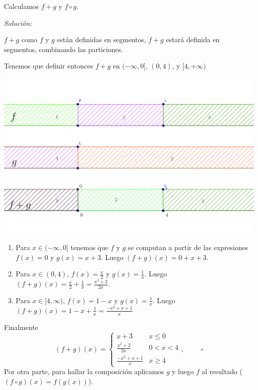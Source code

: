 \documentclass[10pt,a4paper]{article}
\renewcommand{\o}{\circ}
\begin{document}
Calculamos $f + g$ y $f \o g$.


\noindent
\emph{Solución:}

\noindent
$f + g$ como $f$ y $g$ están definidas en segmentos,
$f+g$ estará definida en segmentos, combinando las particiones.


\noindent
Tenemos que definir entonces $f+g$ en $(-\infty,0]$, $(0,4)$,
  y $[4,+\infty)$


\includegraphics{suma.png}

\begin{enumerate}
\item Para $x \in (-\infty,0]$ tenemos que $f$ y $g$ se computan
  a partir de las expresiones $f(x) = 0$ y $g(x) = x + 3$.
  Luego $(f+g) (x) = 0 + x + 3$.

\item Para $x \in (0,4)$, $f(x) = \frac{x}{2}$ y $g(x) = \frac{1}{x}$.
  Luego $(f+g) (x) = \frac{x}{2} + \frac{1}{x} = \frac{x^2+2}{2x}$.

\item Para $x \in [4,\infty)$,  $f(x) = 1-x$ y $g(x) =  \frac{1}{x}$.
  Luego $(f+g) (x) = 1 - x + \frac{1}{x} = \frac{-x^2 + x + 1}{x}$
  
\end{enumerate}


Finalmente
$$(f+g)(x) = \left \{ \begin{matrix} x+3 & x \leq 0
\\ \frac{x^2+2}{2x} & 0 < x < 4 
\\ \frac{-x^2 + x + 1}{x} & x \geq 4 \end{matrix}\right. , \hspace{1cm}
\square $$
\newline
\noindent
Por otra parte, para hallar la composición aplicamos
$g$ y luego $f$ al resultado ($(f \o g)(x) = f (g (x)) $).
\end{document}
